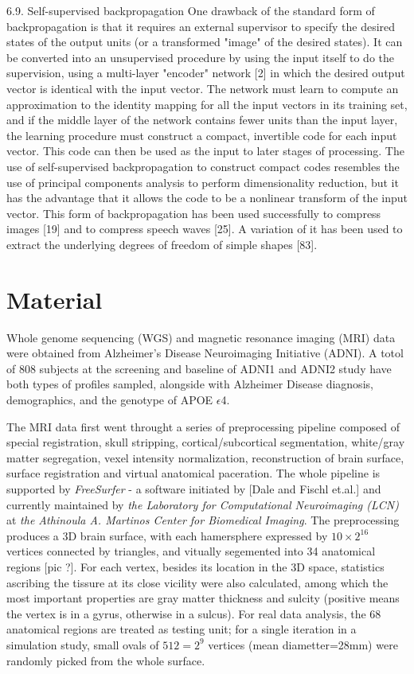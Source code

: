 \documentclass[twocolumn]{article}
\begin{document}
6.9. Self-supervised backpropagation
One drawback of the standard form of backpropagation is that it requires an external supervisor to specify the desired states of the output units (or a transformed "image" of the desired states). It can be converted into an unsupervised procedure by using the input itself to do the supervision, using a multi-layer "encoder" network [2] in which the desired output vector is identical with the input vector. The network must learn to compute an approximation to the identity mapping for all the input vectors in its training set, and if the middle layer of the network contains fewer units than the input
layer, the learning procedure must construct a compact, invertible code for each input vector. This code can then be used as the input to later stages of processing.
The use of self-supervised backpropagation to construct compact codes resembles the use of principal components analysis to perform dimensionality reduction, but it has the advantage that it allows the code to be a nonlinear transform of the input vector. This form of backpropagation has been used successfully to compress images [19] and to compress speech waves [25]. A variation of it has been used to extract the underlying degrees of freedom of simple shapes [83].

\section{Material}
Whole genome sequencing (WGS) and magnetic resonance imaging (MRI) data were obtained from Alzheimer’s Disease Neuroimaging Initiative (ADNI). A totol of 808 subjects at the screening and baseline of ADNI1 and ADNI2 study have both types of profiles sampled, alongside with Alzheimer Disease diagnosis, demographics, and the genotype of APOE $\epsilon$4.

The MRI data first went throught a series of preprocessing pipeline composed of special registration, skull stripping, cortical/subcortical segmentation, white/gray matter segregation, vexel intensity normalization, reconstruction of brain surface, surface registration and virtual anatomical paceration. The whole pipeline is supported by \emph{FreeSurfer} - a software initiated by [Dale and Fischl et.al.] and currently maintained by \textit{the Laboratory for Computational Neuroimaging (LCN)}  at \textit {the Athinoula A. Martinos Center for Biomedical Imaging}. The preprocessing produces a 3D brain surface, with each hamersphere expressed by $10\times2^16$ vertices connected by triangles, and vitually segemented into 34 anatomical regions [pic ?]. For each vertex, besides its location in the 3D space, statistics ascribing the tissure at its close vicility were also calculated, among which the most important properties are gray matter thickness and sulcity (positive means the vertex is in a gyrus, otherwise in a sulcus). For real data analysis, the 68 anatomical regions are treated as testing unit; for a single iteration in a simulation study, small ovals of $512=2^9$ vertices (mean diametter=28mm) were randomly picked from the whole surface.
\end{document}
